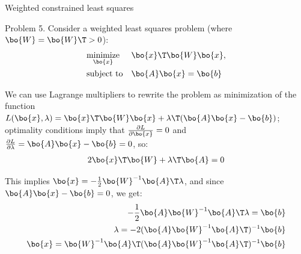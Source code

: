 \documentclass{beamer}
\begin{document}
\begin{frame}{Weighted constrained least squares}
	\begin{flushleft}
		
		Problem 5. Consider a weighted least squares problem (where $\bo{W} = \bo{W}\T > 0$):
		\begin{equation}
			\begin{aligned}
				& \underset{\bo{x}}{\text{minimize}}
				& & \bo{x}\T \bo{W} \bo{x}, \\
				& \text{subject to}
				& & \bo{A}\bo{x}=\bo{b}
			\end{aligned}
		\end{equation}
		
		We can use Lagrange multipliers to rewrite the problem as minimization of the function $L(\bo{x}, \lambda) = \bo{x}\T \bo{W} \bo{x} + \lambda\T ( \bo{A}\bo{x}-\bo{b})$; optimality conditions imply that $\frac{\partial L}{\partial  \bo{x}} = 0$ and $\frac{\partial  L}{\partial  \lambda} = \bo{A}\bo{x}-\bo{b} = 0$, so:
		\begin{align}
			2\bo{x}\T \bo{W} + \lambda\T \bo{A} = 0
		\end{align}		
		
		This implies $\bo{x} = -\frac{1}{2} \bo{W}^{-1} \bo{A}\T \lambda$, and since $\bo{A}\bo{x}-\bo{b} = 0$, we get:
		\begin{align}
			-\frac{1}{2}\bo{A}\bo{W}^{-1} \bo{A}\T \lambda= \bo{b} \\
			\lambda = -2 (\bo{A}\bo{W}^{-1} \bo{A}\T)^{-1} \bo{b} \\
			\bo{x} = \bo{W}^{-1} \bo{A}\T (\bo{A}\bo{W}^{-1} \bo{A}\T)^{-1} \bo{b}
		\end{align}		
		
		
	\end{flushleft}
\end{frame}
\end{document}

